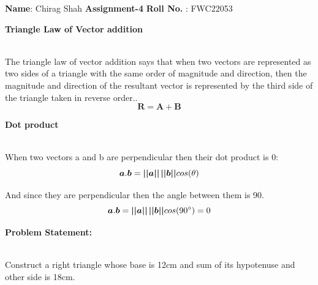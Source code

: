 \documentclass[10pt,a4paper]{report}
\begin{document}
\raggedright \textbf{Name}:\hspace{1mm} Chirag Shah\hspace{3cm} \Large \textbf{Assignment-4}\hspace{2.5cm} %
\normalsize \textbf{Roll No.} :\hspace{1mm} FWC22053\vspace{1cm}
\begin{multicols}{2}

\textbf{Triangle Law of Vector addition }
\vspace{0.5cm}\raggedright \\
The triangle law of vector addition says that when two vectors are represented as two sides of a triangle with the same order of magnitude and direction, then the magnitude and direction of the resultant vector is represented by the third side of the triangle taken in reverse order..\vspace{3mm} \\ 
\begin{equation}
\boldsymbol{R}=\boldsymbol{A}+\boldsymbol{B} 
\end{equation}

\textbf{Dot product}\vspace{1mm}
\raggedright \\When two vectors a and b are perpendicular then their dot product is 0:\vspace{3mm} 
\begin{equation}
\boldsymbol{a}.\boldsymbol{b}=\boldsymbol{||a||}\hspace{0.5mm}\boldsymbol{||b||}cos(\theta)
\end{equation}
\vspace{2mm}
\raggedright And since they are perpendicular then the angle between them is 90.\\
\vspace{2mm}
\begin{equation}
\boldsymbol{a}.\boldsymbol{b}=\boldsymbol{||a||}\hspace{0.5mm}\boldsymbol{||b||}cos(90^{\circ})=0
\end{equation}
\raggedright \textbf{Problem Statement:}\vspace{2mm}
\raggedright \\Construct a right triangle whose base is 12cm and sum of its hypotenuse and other side is 18cm.
\vspace{5mm}


\end{multicols}
\end{document}
